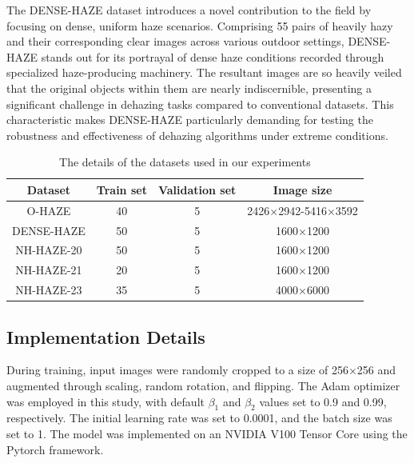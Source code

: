 \documentclass[lettersize,journal]{IEEEtran}
\begin{document}
The DENSE-HAZE dataset introduces a novel contribution to the field by focusing on dense, uniform haze scenarios. Comprising 55 pairs of heavily hazy and their corresponding clear images across various outdoor settings, DENSE-HAZE stands out for its portrayal of dense haze conditions recorded through specialized haze-producing machinery. The resultant images are so heavily veiled that the original objects within them are nearly indiscernible, presenting a significant challenge in dehazing tasks compared to conventional datasets. This characteristic makes DENSE-HAZE particularly demanding for testing the robustness and effectiveness of dehazing algorithms under extreme conditions.

\begin{table}
	\begin{center}
		\caption{The details of the datasets used in our experiments}
		\label{table_dataset}
		\begin{tabular}{ c | c | c | c }
			\hline
			Dataset & Train set & Validation set & Image size \\
			\hline
			O-HAZE & 40 & 5 & 2426×2942-5416×3592 \\
			DENSE-HAZE & 50 & 5 & 1600×1200 \\
			NH-HAZE-20 & 50 & 5 & 1600×1200 \\
			NH-HAZE-21 & 20 & 5 & 1600×1200 \\
			NH-HAZE-23 & 35 & 5 & 4000×6000 \\
			\hline			
		\end{tabular}
	\end{center}
\end{table}

\subsection{Implementation Details}
During training, input images were randomly cropped to a size of 256×256 and augmented through scaling, random rotation, and flipping. The Adam optimizer\cite{kingma2014adam} was employed in this study, with default $\beta_{1}$ and $\beta_{2}$ values set to 0.9 and 0.99, respectively. The initial learning rate was set to 0.0001, and the batch size was set to 1. The model was implemented on an NVIDIA V100 Tensor Core using the Pytorch framework.
\end{document}

